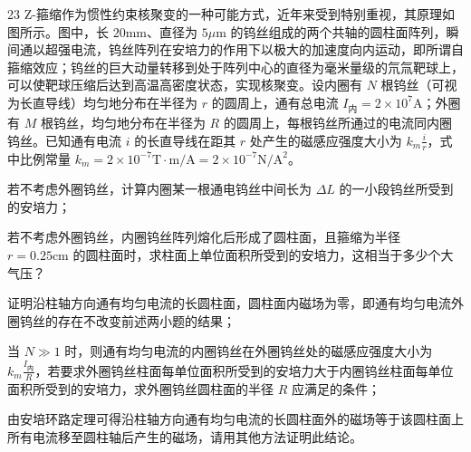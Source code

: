 \begin{problem}[第31届全国中学生物理竞赛复赛][Z-箍缩与安培力]{23}
Z-箍缩作为惯性约束核聚变的一种可能方式，近年来受到特别重视，其原理如图所示。图中，长 $20\mathrm{mm}$、直径为 $5\mu\mathrm{m}$ 的钨丝组成的两个共轴的圆柱面阵列，瞬间通以超强电流，钨丝阵列在安培力的作用下以极大的加速度向内运动，即所谓自箍缩效应；钨丝的巨大动量转移到处于阵列中心的直径为毫米量级的氘氚靶球上，可以使靶球压缩后达到高温高密度状态，实现核聚变。设内圈有 $N$ 根钨丝（可视为长直导线）均匀地分布在半径为 $r$ 的圆周上，通有总电流 $I_{\text{内}} = 2\times 10^{7}\mathrm{A}$；外圈有 $M$ 根钨丝，均匀地分布在半径为 $R$ 的圆周上，每根钨丝所通过的电流同内圈钨丝。已知通有电流 $i$ 的长直导线在距其 $r$ 处产生的磁感应强度大小为 $k_m \frac{i}{r}$，式中比例常量 $k_m = 2 \times 10^{-7}\mathrm{T}\cdot\mathrm{m}/\mathrm{A} = 2 \times 10^{-7}\mathrm{N}/\mathrm{A}^{2}$。
    \begin{subproblem}
        若不考虑外圈钨丝，计算内圈某一根通电钨丝中间长为 $\Delta L$ 的一小段钨丝所受到的安培力；
    \end{subproblem}
    \begin{subproblem}
        若不考虑外圈钨丝，内圈钨丝阵列熔化后形成了圆柱面，且箍缩为半径 $r = 0.25\mathrm{cm}$ 的圆柱面时，求柱面上单位面积所受到的安培力，这相当于多少个大气压？
    \end{subproblem}
    \begin{subproblem}
        证明沿柱轴方向通有均匀电流的长圆柱面，圆柱面内磁场为零，即通有均匀电流外圈钨丝的存在不改变前述两小题的结果；
    \end{subproblem}
    \begin{subproblem}
        当 $N \gg 1$ 时，则通有均匀电流的内圈钨丝在外圈钨丝处的磁感应强度大小为 $k_m \frac{I_{\text{内}}}{R}$，若要求外圈钨丝柱面每单位面积所受到的安培力大于内圈钨丝柱面每单位面积所受到的安培力，求外圈钨丝圆柱面的半径 $R$ 应满足的条件；
    \end{subproblem}
    \begin{subproblem}
        由安培环路定理可得沿柱轴方向通有均匀电流的长圆柱面外的磁场等于该圆柱面上所有电流移至圆柱轴后产生的磁场，请用其他方法证明此结论。
    \end{subproblem}
\end{problem}